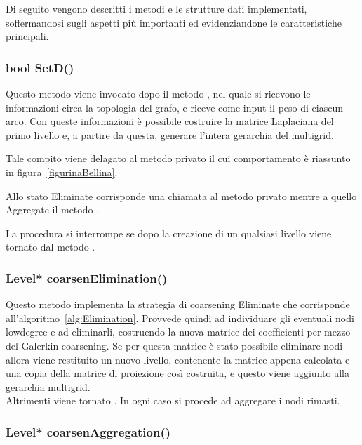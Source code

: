 Di seguito vengono descritti i metodi e le strutture dati implementati, soffermandosi sugli aspetti più importanti ed evidenziandone le caratteristiche principali.

\subsubsection{bool SetD()}
Questo metodo viene invocato dopo il metodo , nel quale si ricevono le informazioni circa la topologia del grafo, e riceve come input il peso di ciascun arco.
Con queste informazioni è possibile costruire la matrice Laplaciana del primo livello e, a partire da questa, generare l'intera gerarchia del multigrid.

Tale compito viene delagato al metodo privato  il cui comportamento è riassunto in figura~\vref{figurinaBellina}.


Allo stato Eliminate corrisponde una chiamata al metodo privato  mentre a quello Aggregate il metodo .

La procedura si interrompe se dopo la creazione di un qualsiasi livello viene tornato  dal metodo .

\subsubsection{Level* coarsenElimination()}

Questo metodo implementa la strategia di coarsening Eliminate che corrisponde all'algoritmo~\vref{alg:Elimination}.
Provvede quindi ad individuare gli eventuali nodi lowdegree e ad eliminarli, costruendo la nuova matrice dei coefficienti per mezzo del Galerkin coarsening.
Se per questa matrice è stato possibile eliminare nodi allora viene restituito un nuovo livello, contenente la matrice appena calcolata e una copia della matrice di proiezione così costruita, e questo viene aggiunto alla gerarchia multigrid.\\
Altrimenti viene tornato . In ogni caso si procede ad aggregare i nodi rimasti. 

\subsubsection{Level* coarsenAggregation()}

